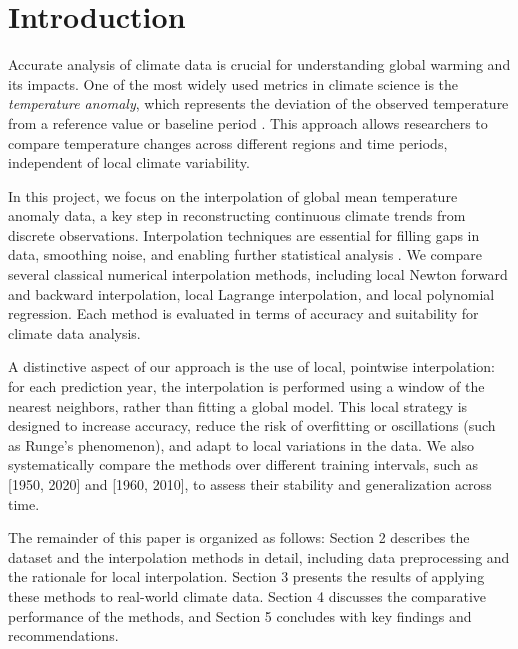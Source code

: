 \section{Introduction}

Accurate analysis of climate data is crucial for understanding global warming and its impacts. One of the most widely used metrics in climate science is the \textit{temperature anomaly}, which represents the deviation of the observed temperature from a reference value or baseline period \cite{gistemp, hansen2010global}. This approach allows researchers to compare temperature changes across different regions and time periods, independent of local climate variability.

In this project, we focus on the interpolation of global mean temperature anomaly data, a key step in reconstructing continuous climate trends from discrete observations. Interpolation techniques are essential for filling gaps in data, smoothing noise, and enabling further statistical analysis \cite{atkinson1989introduction, burden2011numerical}. We compare several classical numerical interpolation methods, including local Newton forward and backward interpolation, local Lagrange interpolation, and local polynomial regression. Each method is evaluated in terms of accuracy and suitability for climate data analysis.

A distinctive aspect of our approach is the use of local, pointwise interpolation: for each prediction year, the interpolation is performed using a window of the nearest neighbors, rather than fitting a global model. This local strategy is designed to increase accuracy, reduce the risk of overfitting or oscillations (such as Runge's phenomenon), and adapt to local variations in the data. We also systematically compare the methods over different training intervals, such as [1950, 2020] and [1960, 2010], to assess their stability and generalization across time.

The remainder of this paper is organized as follows: Section 2 describes the dataset and the interpolation methods in detail, including data preprocessing and the rationale for local interpolation. Section 3 presents the results of applying these methods to real-world climate data. Section 4 discusses the comparative performance of the methods, and Section 5 concludes with key findings and recommendations.